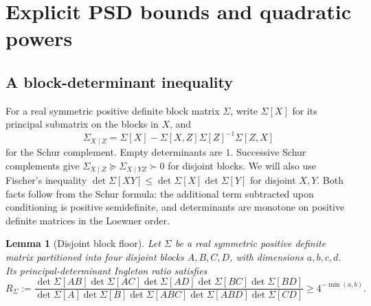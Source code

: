 \documentclass[11pt]{article}
\newtheorem{lemma}[theorem]{Lemma}
\theoremstyle{remark}
\begin{document}
\section{Explicit PSD bounds and quadratic powers}
\label{sec:determinant-power}

\subsection{A block-determinant inequality}

For a real symmetric positive definite block matrix $\Sigma$, write $\Sigma[X]$ for
its principal submatrix on the blocks in $X$, and
\[
 \Sigma_{X\mid Z}
 =\Sigma[X]-\Sigma[X,Z]\Sigma[Z]^{-1}\Sigma[Z,X]
\]
for the Schur complement.  Empty determinants are $1$.
Successive Schur complements give
$\Sigma_{X\mid Z}\succeq\Sigma_{X\mid YZ}\succ0$ for disjoint blocks.
We will also use Fischer's inequality
$\det\Sigma[XY]\le\det\Sigma[X]\det\Sigma[Y]$ for disjoint $X,Y$.
Both facts follow from the Schur formula: the additional term subtracted
upon conditioning is positive semidefinite, and determinants are monotone
on positive definite matrices in the Loewner order.

\begin{lemma}[Disjoint block floor]\label{lem:block-floor}
Let $\Sigma$ be a real symmetric positive definite matrix partitioned into four
disjoint blocks $A,B,C,D$, with dimensions $a,b,c,d$.
Its principal-determinant Ingleton ratio satisfies
\[
 R_\Sigma:=
 \frac{\det\Sigma[AB]\det\Sigma[AC]\det\Sigma[AD]
       \det\Sigma[BC]\det\Sigma[BD]}
      {\det\Sigma[A]\det\Sigma[B]\det\Sigma[ABC]
       \det\Sigma[ABD]\det\Sigma[CD]}
 \ge4^{-\min(a,b)}.
\]
\end{lemma}
\end{document}
